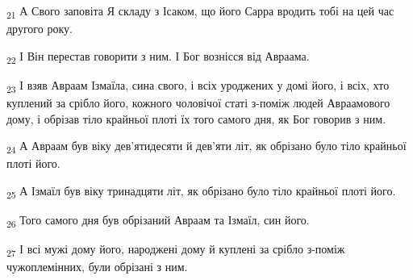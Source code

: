\begin{tcolorbox}
\textsubscript{21} А Свого заповіта Я складу з Ісаком, що його Сарра вродить тобі на цей час другого року.
\end{tcolorbox}
\begin{tcolorbox}
\textsubscript{22} І Він перестав говорити з ним. І Бог вознісся від Авраама.
\end{tcolorbox}
\begin{tcolorbox}
\textsubscript{23} І взяв Авраам Ізмаїла, сина свого, і всіх уроджених у домі його, і всіх, хто куплений за срібло його, кожного чоловічої статі з-поміж людей Авраамового дому, і обрізав тіло крайньої плоті їх того самого дня, як Бог говорив з ним.
\end{tcolorbox}
\begin{tcolorbox}
\textsubscript{24} А Авраам був віку дев'ятидесяти й дев'яти літ, як обрізано було тіло крайньої плоті його.
\end{tcolorbox}
\begin{tcolorbox}
\textsubscript{25} А Ізмаїл був віку тринадцяти літ, як обрізано було тіло крайньої плоті його.
\end{tcolorbox}
\begin{tcolorbox}
\textsubscript{26} Того самого дня був обрізаний Авраам та Ізмаїл, син його.
\end{tcolorbox}
\begin{tcolorbox}
\textsubscript{27} І всі мужі дому його, народжені дому й куплені за срібло з-поміж чужоплемінних, були обрізані з ним.
\end{tcolorbox}
